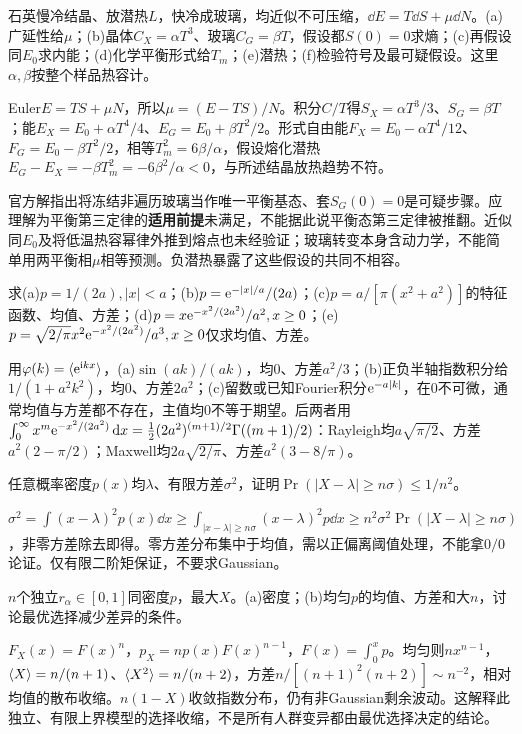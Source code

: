 \begin{exercise}[原题6(a)--(f)]\label{r:333-1-6}
石英慢冷结晶、放潜热$L$，快冷成玻璃，均近似不可压缩，$\dd E=T\dd S+\mu\dd N$。(a)广延性给$\mu$；(b)晶体$C_X=\alpha T^3$、玻璃$C_G=\beta T$，假设都$S(0)=0$求熵；(c)再假设同$E_0$求内能；(d)化学平衡形式给$T_m$；(e)潜热；(f)检验符号及最可疑假设。这里$\alpha,\beta$按整个样品热容计。
\end{exercise}
\begin{solution}
Euler$E=TS+\mu N$，所以$\mu=(E-TS)/N$。积分$C/T$得$S_X=\alpha T^3/3$、$S_G=\beta T$；能$E_X=E_0+\alpha T^4/4$、$E_G=E_0+\beta T^2/2$。形式自由能$F_X=E_0-\alpha T^4/12$、$F_G=E_0-\beta T^2/2$，相等$T_m^2=6\beta/\alpha$，假设熔化潜热$E_G-E_X=-\beta T_m^2=-6\beta^2/\alpha<0$，与所述结晶放热趋势不符。

官方解指出将冻结非遍历玻璃当作唯一平衡基态、套$S_G(0)=0$是可疑步骤。应理解为平衡第三定律的\textbf{适用前提}未满足，不能据此说平衡态第三定律被推翻。近似同$E_0$及将低温热容幂律外推到熔点也未经验证；玻璃转变本身含动力学，不能简单用两平衡相$\mu$相等预测。负潜热暴露了这些假设的共同不相容。
\end{solution}
\begin{exercise}[原题7(a)--(e)]\label{r:333-1-7}
求(a)$p=1/(2a),|x|<a$；(b)$p=\mathrm e^{-|x|/a}/(2a)$；(c)$p=a/[\pi(x^2+a^2)]$的特征函数、均值、方差；(d)$p=x\mathrm e^{-x^2/(2a^2)}/a^2,x\ge0$；(e)$p=\sqrt{2/\pi}x^2\mathrm e^{-x^2/(2a^2)}/a^3,x\ge0$仅求均值、方差。
\end{exercise}
\begin{solution}
用$\varphi(k)=\langle \mathrm e^{\mathrm i kx}\rangle$，(a)$\sin(ak)/(ak)$，均0、方差$a^2/3$；(b)正负半轴指数积分给$1/(1+a^2k^2)$，均0、方差$2a^2$；(c)留数或已知Fourier积分$\mathrm e^{-a|k|}$，在0不可微，通常均值与方差都不存在，主值均0不等于期望。后两者用$\int_0^\infty x^m\mathrm e^{-x^2/(2a^2)}\,\mathrm d x=\tfrac12(2a^2)^{(m+1)/2}\Gamma((m+1)/2)$：Rayleigh均$a\sqrt{\pi/2}$、方差$a^2(2-\pi/2)$；Maxwell均$2a\sqrt{2/\pi}$、方差$a^2(3-8/\pi)$。
\end{solution}
\begin{exercise}[原题8]\label{r:333-1-8}
任意概率密度$p(x)$均$\lambda$、有限方差$\sigma^2$，证明$\Pr(|X-\lambda|\ge n\sigma)\le1/n^2$。
\end{exercise}
\begin{solution}
$\sigma^2=\int(x-\lambda)^2p(x)\dd x\ge\int_{|x-\lambda|\ge n\sigma}(x-\lambda)^2p\dd x\ge n^2\sigma^2\Pr(|X-\lambda|\ge n\sigma)$，非零方差除去即得。零方差分布集中于均值，需以正偏离阈值处理，不能拿$0/0$论证。仅有限二阶矩保证，不要求Gaussian。
\end{solution}
\begin{exercise}[原题9(a),(b)]\label{r:333-1-9}
$n$个独立$r_\alpha\in[0,1]$同密度$p$，最大$X$。(a)密度；(b)均匀$p$的均值、方差和大$n$，讨论最优选择减少差异的条件。
\end{exercise}
\begin{solution}
$F_X(x)=F(x)^n$，$p_X=np(x)F(x)^{n-1}$，$F(x)=\int_0^xp$。均匀则$nx^{n-1}$，$\langle X\rangle=n/(n+1)$、$\langle X^2\rangle=n/(n+2)$，方差$n/[(n+1)^2(n+2)]\sim n^{-2}$，相对均值的散布收缩。$n(1-X)$收敛指数分布，仍有非Gaussian剩余波动。这解释此独立、有限上界模型的选择收缩，不是所有人群变异都由最优选择决定的结论。
\end{solution}
